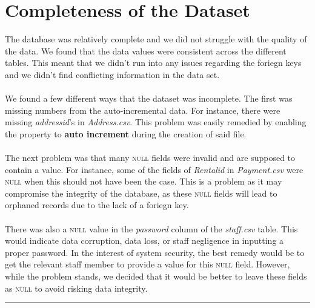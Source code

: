\documentclass{article}
\begin{document}
\section{Completeness of the Dataset}
	The database was relatively complete and we did not struggle with the quality of the data. We found that the data values were consistent across the different tables. This meant
	 that we didn’t run into any issues regarding the foriegn keys and we didn’t find conflicting information in the data set.
	\\\\
	We found a few different ways that the dataset was incomplete. The first was missing numbers from the auto-incremental data. For instance,
	 there were missing \emph{address\textunderscore id}’s in \emph{Address.csv}. This problem was easily remedied by enabling the property to \textbf{auto increment} during the creation of said file. 
	\\\\
	The next problem was
	 that many \textsc{null} fields were invalid and are supposed to contain a value. 
	For instance, some of the fields of \emph{Rental\textunderscore id} in \emph{Payment.csv} were \textsc{null} when this should not have been the case. This is a problem as it 
	may compromise the integrity
	 of the database, as these \textsc{null} fields will lead to orphaned records due to the lack of a foriegn key.
	\\\\
	There was also a \textsc{null} value in the \emph{password} column of the \emph{staff.csv} table. This would indicate data corruption, data loss, or staff negligence in inputting a proper password. In the interest of system security, the best remedy would be to get the relevant staff member to provide a value for this \textsc{null} field. However, while the problem stands, we decided that it would be better to leave these fields as \textsc{null} to avoid risking data integrity.
	\\
	\rule{\textwidth}{0.4pt}
\end{document}
